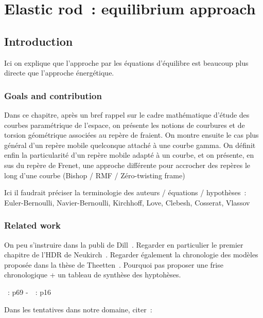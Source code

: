 
\chapter{Elastic rod~: equilibrium approach}
\label{sec:ch_kirchhoff}

\section{Introduction}
Ici on explique que l'approche par les équations d'équilibre est beaucoup plus directe que l'approche énergétique.

\subsection{Goals and contribution}
Dans ce chapitre, après un bref rappel sur le cadre mathématique d'étude des courbes paramétrique de l'espace, on présente les notions de courbures et de torsion géométrique associées au repère de fraient. On montre ensuite le cas plus général d'un repère mobile quelconque attaché à une courbe gamma. On définit enfin la particularité d'un repère mobile adapté à un courbe, et on présente, en sus du repère de Frenet, une approche différente pour accrocher des repères le long d'une courbe (Bishop / RMF / Zéro-twisting frame)

Ici il faudrait préciser la terminologie des auteurs / équations / hypothèses~:
Euler-Bernoulli, Navier-Bernoulli, Kirchhoff, Love, Clebesh, Cosserat, Vlassov

\subsection{Related work}
On peu s'instruire dans la publi de Dill~\cite{Dill1992}.
Regarder en particulier le premier chapitre de l'HDR de Neukirch~\cite{Neukirch2009}.
Regarder également la chronologie des modèles proposée dans la thèse de Theetten~\cite{Theetten2007}.
Pourquoi pas proposer une frise chronologique + un tableau de synthèse des hyptohèses.

\cite{Dill1992}
\citet{Neukirch2009}
\cite{Adriaenssens1999}
\cite{Hoogenboom2006}
\cite{Lang2009}
\cite{Spillmann2008}
\cite{Antman2005}

\cite{Neukirch2009}~: p69 -~\cite{Dill1992}~: p16

Dans les tentatives dans notre domaine, citer~:

